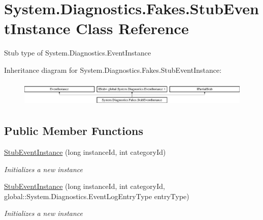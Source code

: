 \hypertarget{class_system_1_1_diagnostics_1_1_fakes_1_1_stub_event_instance}{\section{System.\-Diagnostics.\-Fakes.\-Stub\-Event\-Instance Class Reference}
\label{class_system_1_1_diagnostics_1_1_fakes_1_1_stub_event_instance}
}


Stub type of System.\-Diagnostics.\-Event\-Instance 


Inheritance diagram for System.\-Diagnostics.\-Fakes.\-Stub\-Event\-Instance\-:\begin{figure}[H]
\begin{center}
\leavevmode
\includegraphics[height=1.236203cm]{class_system_1_1_diagnostics_1_1_fakes_1_1_stub_event_instance}
\end{center}
\end{figure}
\subsection*{Public Member Functions}
\begin{DoxyCompactItemize}
\item 
\hyperlink{class_system_1_1_diagnostics_1_1_fakes_1_1_stub_event_instance_a28b3bf34020f428af050629ad9ffae5f}{Stub\-Event\-Instance} (long instance\-Id, int category\-Id)
\begin{DoxyCompactList}\small\item\em Initializes a new instance\end{DoxyCompactList}\item 
\hyperlink{class_system_1_1_diagnostics_1_1_fakes_1_1_stub_event_instance_a085caab17cff83003101c3638aa4b219}{Stub\-Event\-Instance} (long instance\-Id, int category\-Id, global\-::\-System.\-Diagnostics.\-Event\-Log\-Entry\-Type entry\-Type)
\begin{DoxyCompactList}\small\item\em Initializes a new instance\end{DoxyCompactList}\end{DoxyCompactItemize}
